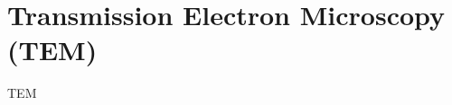 \documentclass[\main/dresen_thesis.tex]{subfiles}
\begin{document}
  \section{Transmission Electron Microscopy (TEM)}
    \label{app:methods:tem}
    TEM
\end{document}
